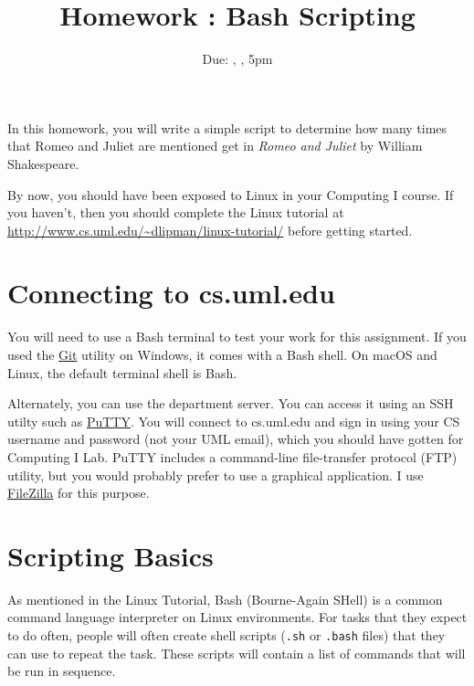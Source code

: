 \documentclass[12pt]{article}
\title{Homework \hwno: Bash Scripting}
\date{Due: \dayofweekname{\duedate}{\duemonth}{\year}, \monthname[\duemonth] \duedate, 5pm}
\newcommand{\code}[1]{\texttt{#1}}
\begin{document}
\maketitle


In this homework, you will write a simple script to determine how many times that Romeo and Juliet are mentioned get in \emph{Romeo and Juliet} by William Shakespeare.

By now, you should have been exposed to Linux in your Computing I course.  If you haven't, then you should complete the Linux tutorial at \url{http://www.cs.uml.edu/~dlipman/linux-tutorial/} before getting started.

\section*{Connecting to cs.uml.edu}
You will need to use a Bash terminal to test your work for this assignment.
If you used the \href{https://git-scm.com/}{Git} utility on Windows, it comes with a Bash shell.
On macOS and Linux, the default terminal shell is Bash.

Alternately, you can use the department server.
You can access it using an SSH utilty such as \href{https://www.chiark.greenend.org.uk/~sgtatham/putty/latest.html}{PuTTY}.
You will connect to cs.uml.edu and sign in using your CS username and password (not your UML email), which you should have gotten for Computing I Lab.
PuTTY includes a command-line file-transfer protocol (FTP) utility, but you would probably prefer to use a graphical application.
I use \href{https://filezilla-project.org/}{FileZilla} for this purpose.



\section*{Scripting Basics}
As mentioned in the Linux Tutorial, Bash (Bourne-Again SHell) is a common command language interpreter on Linux environments.
For tasks that they expect to do often, people will often create shell scripts (\code{.sh} or \code{.bash} files) that they can use to repeat the task.
These scripts will contain a list of commands that will be run in sequence.
\end{document}
